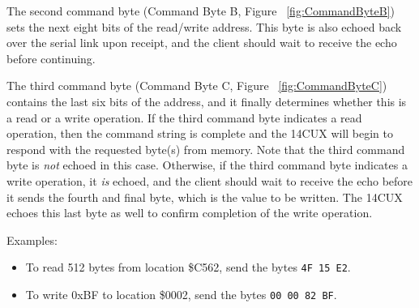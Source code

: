 \documentclass[11pt,twocolumn]{scrartcl}
\begin{document}
The second command byte (Command Byte B, Figure ~\ref{fig:CommandByteB}) sets the next eight bits of the read/write address. This byte is also echoed back over the serial link upon receipt, and the client should wait to receive the echo before continuing.

The third command byte (Command Byte C, Figure ~\ref{fig:CommandByteC}) contains the last six bits of the address, and it finally determines whether this is a read or a write operation. If the third command byte indicates a read operation, then the command string is complete and the 14CUX will begin to respond with the requested byte(s) from memory. Note that the third command byte is \textit{not} echoed in this case. Otherwise, if the third command byte indicates a write operation, it \textit{is} echoed, and the client should wait to receive the echo before it sends the fourth and final byte, which is the value to be written. The 14CUX echoes this last byte as well to confirm completion of the write operation.

Examples:
\begin{itemize}
\item To read 512 bytes from location \$C562, send the bytes \texttt{4F 15 E2}.
\item To write 0xBF to location \$0002, send the bytes \texttt{00 00 82 BF}.
\end{itemize}
\end{document}
